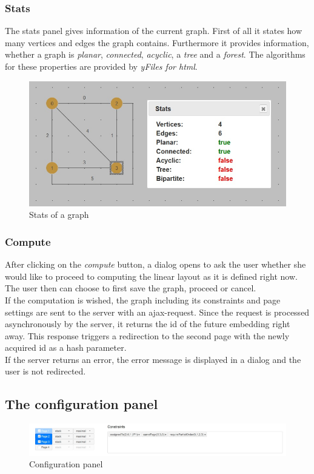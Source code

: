\subsubsection{Stats}
The stats panel gives information of the current graph. First of all it states how many vertices and edges the graph contains. Furthermore it provides information, whether a graph is \textit{planar}, \textit{connected}, \textit{acyclic}, a  \textit{tree} and a \textit{forest}. The algorithms for these properties are provided by \textit{yFiles for html}.
\begin{figure}[!h]
\begin{center}
\includegraphics[width=1\textwidth]{figures/figIndex/StatsPanels.jpg}
\caption{Stats of a graph}
\label{img:stats}
\end{center}
\end{figure}
\subsubsection{Compute}
After clicking on the \textit{compute} button, a dialog opens to ask the user whether she would like to proceed to computing the linear layout as it is defined right now. The user then can choose to first save the graph, proceed or cancel.\\
If the computation is wished, the graph including its constraints and page settings are sent to the server with an ajax-request. Since the request is processed asynchronously by the server, it returns the id of the future embedding right away. This response triggers a redirection to the second page with the newly acquired id as a hash parameter.\\
If the server returns an error, the error message is displayed in a dialog and the user is not redirected.
\subsection{The configuration panel}
\begin{figure}[!h]
\begin{center}
\includegraphics[width=1\textwidth]{figures/figIndex/ConfigPanel.jpg}
\caption{Configuration panel}
\label{img:confPan}
\end{center}
\end{figure}
